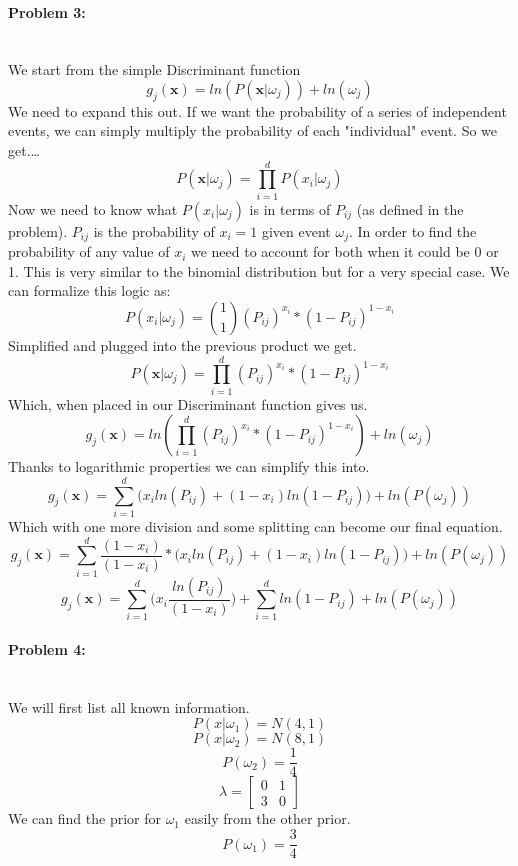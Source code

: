 \documentclass[12pt]{article}
\begin{document}
    \paragraph{Problem 3:} ~\\
    We start from the simple Discriminant function
    \[ g_j(\mathbf{x}) = ln(P( \mathbf{x} | \omega _{j})) + ln(\omega _{j}) \]
    We need to expand this out. If we want the probability of a series of independent events, 
    we can simply multiply the probability of each "individual" event. So we get.\dots
    \[ 
        P( \mathbf{x} | \omega _{j}) = \prod_{i=1}^{d} P( x_{i} | \omega _{j})
    \]
    Now we need to know what \( P( x_{i} | \omega _{j}) \) is in terms of \( P_{ij} \) (as defined 
    in the problem). \( P_{ij} \) is the probability of \( x_i = 1 \) given event \( \omega_j \).
    In order to find the probability of any value of \( x_i \) we need to account for both when it 
    could be 0 or 1. This is very similar to the binomial distribution but for a very special case.
    We can formalize this logic as:
    \[
        P( x_{i} | \omega _{j}) = \binom{1}{1} (P_{ij})^{x_{i}} * (1 - P_{ij})^{1 - x_{i}}
    \]
    Simplified and plugged into the previous product we get.
    \[
        P( \mathbf{x} | \omega _{j}) = \prod_{i=1}^{d} (P_{ij})^{x_{i}} * (1 - P_{ij})^{1 - x_{i}}
    \]
    Which, when placed in our Discriminant function gives us.
    \[
        g_j(\mathbf{x}) = ln(\prod_{i=1}^{d} (P_{ij})^{x_{i}} * (1 - P_{ij})^{1 - x_{i}}) + ln(\omega _{j})
    \]
    Thanks to logarithmic properties we can simplify this into.
    \[
        g_j(\mathbf{x}) = \sum_{i=1}^{d} \big( x_{i}ln(P_{ij}) + (1 - x_{i})ln(1 - P_{ij}) \big) + ln(P(\omega _{j}))
    \]
    Which with one more division and some splitting can become our final equation.
    \[
        g_j(\mathbf{x}) = \sum_{i=1}^{d} \frac{(1 - x_{i})}{(1 - x_{i})} * \big( x_{i}ln(P_{ij}) + (1 - x_{i})ln(1 - P_{ij}) \big) + ln(P(\omega _{j}))
    \]
    \[
        g_j(\mathbf{x}) = \sum_{i=1}^{d} \big( x_{i} \frac{ln(P_{ij})}{(1 - x_{i})} \big) +  \sum_{i=1}^{d} ln(1 - P_{ij})+ ln(P(\omega _{j}))
    \]

    \paragraph{Problem 4: } ~\\
    We will first list all known information.
    \[ P(x|\omega_{1}) = N(4, 1) \]
    \[ P(x|\omega_{2}) = N(8, 1) \]
    \[ P(\omega_{2}) = \frac{1}{4} \]
    \[
        \lambda = \begin{bmatrix}
            0 & 1 \\
            3 & 0
        \end{bmatrix}
    \]
    We can find the prior for \(\omega_1\) easily from the other prior.
    \[ P(\omega_{1}) = \frac{3}{4} \]
    
\end{document}
